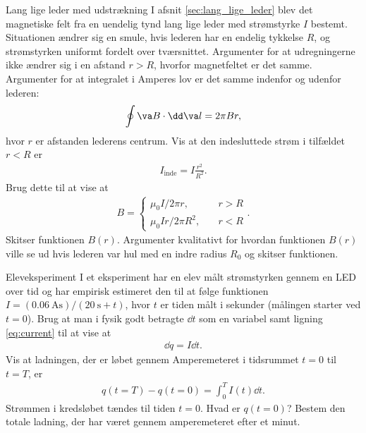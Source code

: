 \begin{opgave}{Lang lige leder med udstrækning}
    I afsnit \ref{sec:lang_lige_leder} blev det magnetiske felt fra en uendelig tynd lang lige leder med strømstyrke $I$ bestemt. Situationen ændrer sig en smule, hvis lederen har en endelig tykkelse $R$, og strømstyrken uniformt fordelt over tværsnittet.
    \opg Argumenter for at udregningerne ikke ændrer sig i en afstand $r>R$, hvorfor magnetfeltet er det samme.
    \opg Argumenter for at integralet i Amperes lov er det samme indenfor og udenfor lederen:
    \begin{align}
        \oint \va B \cdot \dd \va l = 2\pi B r,
    \end{align}
    hvor $r$ er afstanden lederens centrum.
    \opg Vis at den indesluttede strøm i tilfældet $r<R$ er
    \begin{align}
        I_\mathrm{inde} = I \frac{r^2}{R^2}.
    \end{align}
    \opg Brug dette til at vise at
    \begin{align}
        B = \begin{cases}
            \mu_0I/2\pi r, \quad &r>R \\
            \mu_0Ir/2\pi R^2, \quad &r<R
        \end{cases}
        .
    \end{align}
    \opg Skitser funktionen $B(r)$.
    \opg Argumenter kvalitativt for hvordan funktionen $B(r)$ ville se ud hvis lederen var hul med en indre radius $R_0$ og skitser funktionen.
\end{opgave}

\begin{opgave}{Eleveksperiment}
    I et eksperiment har en elev målt strømstyrken gennem en LED over tid og har empirisk estimeret den til at følge funktionen $I=\left(\SI{0.06}{\ampere\second}\right)/\left(\SI{20}{\second}+t\right)$, hvor $t$ er tiden målt i sekunder (målingen starter ved $t=0$).
    \opg Brug at man i fysik godt betragte $\dd{t}$ som en variabel samt ligning \eqref{eq:current} til at vise at
    \begin{align*}
        \dd{q} = I\dd{t}.
    \end{align*}
    \opg Vis at ladningen, der er løbet gennem Amperemeteret i tidsrummet $t=0$ til $t=T$, er
    \begin{align*}
        q(t=T) - q(t=0) = \int_0^T I(t) \dd{t}.
    \end{align*}
    \opg Strømmen i kredsløbet tændes til tiden $t=0$. Hvad er $q(t=0)$?
    \opg Bestem den totale ladning, der har været gennem amperemeteret efter et minut.
\end{opgave}

